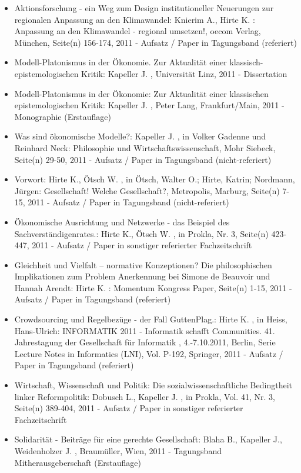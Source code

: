 \begin{itemize}
	 \item Aktionsforschung - ein Weg zum Design institutioneller Neuerungen zur regionalen Anpassung an den Klimawandel: Knierim A., Hirte K. : Anpassung an den Klimawandel - regional umsetzen!, oecom Verlag, München, Seite(n) 156-174, 2011 - Aufsatz / Paper in Tagungsband (referiert)
	 \item Modell-Platonismus in der Ökonomie. Zur Aktualität einer klassisch-epistemologischen Kritik: Kapeller J. , Universität Linz, 2011 - Dissertation
	 \item Modell-Platonismus in der Ökonomie: Zur Aktualität einer klassischen epistemologischen Kritik: Kapeller J. , Peter Lang, Frankfurt/Main, 2011 - Monographie (Erstauflage)
	 \item Was sind ökonomische Modelle?: Kapeller J. , in Volker Gadenne und Reinhard Neck: Philosophie und Wirtschaftswissenschaft, Mohr Siebeck, Seite(n) 29-50, 2011 - Aufsatz / Paper in Tagungsband (nicht-referiert)
	 \item Vorwort: Hirte K., Ötsch W. , in Ötsch, Walter O.; Hirte, Katrin; Nordmann, Jürgen: Gesellschaft! Welche Gesellschaft?, Metropolis, Marburg, Seite(n) 7-15, 2011 - Aufsatz / Paper in Tagungsband (nicht-referiert)
	 \item Ökonomische Ausrichtung und Netzwerke - das Beispiel des Sachverständigenrates.: Hirte K., Ötsch W. , in Prokla, Nr. 3, Seite(n) 423-447, 2011 - Aufsatz / Paper in sonstiger referierter Fachzeitschrift
	 \item Gleichheit und Vielfalt – normative Konzeptionen? Die philosophischen Implikationen zum Problem Anerkennung bei Simone de Beauvoir und Hannah Arendt: Hirte K. : Momentum Kongress Paper, Seite(n) 1-15, 2011 - Aufsatz / Paper in Tagungsband (referiert)
	 \item Crowdsourcing und Regelbezüge - der Fall GuttenPlag.: Hirte K. , in Heiss, Hans-Ulrich: INFORMATIK 2011 - Informatik schafft Communities. 41. Jahrestagung der Gesellschaft für Informatik , 4.-7.10.2011, Berlin, Serie Lecture Notes in Informatics (LNI), Vol. P-192, Springer, 2011 - Aufsatz / Paper in Tagungsband (referiert)
	 \item Wirtschaft, Wissenschaft und Politik: Die sozialwissenschaftliche Bedingtheit linker Reformpolitik: Dobusch L., Kapeller J. , in Prokla, Vol. 41, Nr. 3, Seite(n) 389-404, 2011 - Aufsatz / Paper in sonstiger referierter Fachzeitschrift
	 \item Solidarität - Beiträge für eine gerechte Gesellschaft: Blaha B., Kapeller J., Weidenholzer J. , Braumüller, Wien, 2011 - Tagungsband Mitherausgeberschaft (Erstauflage)
\end{itemize} 
